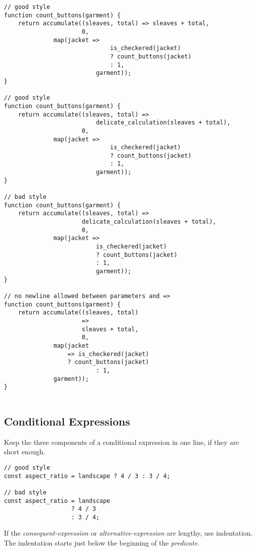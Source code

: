 \begin{lstlisting}
// good style
function count_buttons(garment) {
    return accumulate((sleaves, total) => sleaves + total,
                      0, 
		      map(jacket =>
                              is_checkered(jacket)
                              ? count_buttons(jacket)
                              : 1,
                          garment));
}

// good style
function count_buttons(garment) {
    return accumulate((sleaves, total) =>
                          delicate_calculation(sleaves + total),
                      0, 
		      map(jacket =>
                              is_checkered(jacket)
                              ? count_buttons(jacket)
                              : 1,
                          garment));
}

// bad style
function count_buttons(garment) {
    return accumulate((sleaves, total) =>
                      delicate_calculation(sleaves + total),
                      0, 
		      map(jacket =>
                          is_checkered(jacket)
                          ? count_buttons(jacket)
                          : 1,
                          garment));
}

// no newline allowed between parameters and =>
function count_buttons(garment) {
    return accumulate((sleaves, total)
                      =>
                      sleaves + total,
                      0, 
		      map(jacket
		          => is_checkered(jacket)
		          ? count_buttons(jacket)
                          : 1,
			  garment));
}


\end{lstlisting}


  \subsection*{Conditional Expressions}
\label{condex}
Keep the three components of a conditional expression in one line, if they are short enough.

\begin{lstlisting}
// good style
const aspect_ratio = landscape ? 4 / 3 : 3 / 4;

// bad style
const aspect_ratio = landscape
                   ? 4 / 3
                   : 3 / 4;
\end{lstlisting}

If the \textit{consequent-expression} or \textit{alternative-expression} are lengthy, use
indentation. The indentation starts just below the beginning of the
\textit{predicate}.

